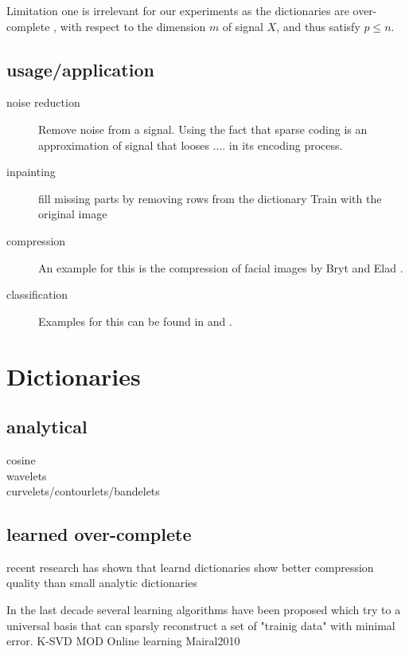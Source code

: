 Limitation one is irrelevant for our experiments as the dictionaries are over-complete 
, with respect to the dimension $m$ of signal $X$, and thus satisfy $p\leq n$.


\subsection{usage/application}
\begin{description}
\item[noise reduction]
Remove noise from a signal. Using the fact that sparse coding 
is an approximation of signal that looses .... in its encoding process. 
\cite{Elad2006}

\item[inpainting]
fill missing parts by removing rows from the dictionary
Train with the original image
\cite{mairal08sparse}

\item[compression] An example for this is the compression of facial images by Bryt and Elad \cite{Bryt2008}.
\item[classification] Examples for this can be found in \cite{Mairal2008b} and \cite{Bar2009}.
\end{description}



\section{Dictionaries}
\subsection{analytical}
\begin{description}
 \item[cosine]
 \item[wavelets]
 \item[curvelets/contourlets/bandelets]
\end{description}

\subsection{learned over-complete}
recent research has shown that learnd dictionaries show better compression quality than small analytic dictionaries \cite{Aharon2006} \cite{Chen1998} 


In the last decade several learning algorithms have been proposed which try to a universal basis that 
can sparsly reconstruct a set of "trainig data" with minimal error. 
K-SVD
MOD
Online learning
Mairal2010

